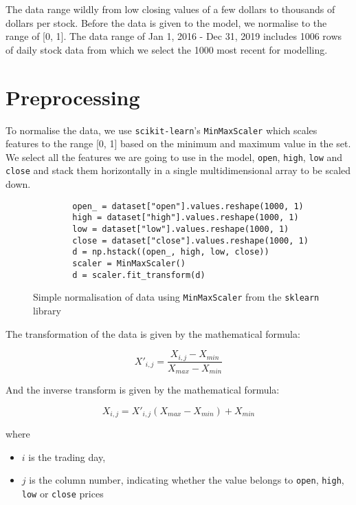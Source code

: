 The data range wildly from low closing values of a few dollars to thousands of dollars per stock. Before the data is given to the model, we normalise to the range of [0, 1]. The data range of Jan 1, 2016 - Dec 31, 2019 includes 1006 rows of daily stock data from which we select the 1000 most recent for modelling.

\section{Preprocessing}

To normalise the data, we use \texttt{scikit-learn}'s \texttt{MinMaxScaler} which scales features to the range [0, 1] based on the minimum and maximum value in the set. We select all the features we are going to use in the model, \texttt{open}, \texttt{high}, \texttt{low} and \texttt{close} and stack them horizontally in a single multidimensional array to be scaled down.

\begin{figure}[H]
    \begin{verbatim}
        open_ = dataset["open"].values.reshape(1000, 1)
        high = dataset["high"].values.reshape(1000, 1)
        low = dataset["low"].values.reshape(1000, 1)
        close = dataset["close"].values.reshape(1000, 1)
        d = np.hstack((open_, high, low, close))
        scaler = MinMaxScaler()
        d = scaler.fit_transform(d)
    \end{verbatim}
    \caption{Simple normalisation of data using \texttt{MinMaxScaler} from the \texttt{sklearn} library}
    \label{code:data_scaling}
\end{figure}

The transformation of the data is given by the mathematical formula:

\begin{equation}
    X'_{i, j} = \frac{X_{i, j} - X_{min}}{X_{max} - X_{min}}
\end{equation}

And the inverse transform is given by the mathematical formula:

\begin{equation}
    X_{i, j} = X'_{i, j} (X_{max} - X_{min}) + X_{min}
\end{equation}

where 
\begin{itemize}[nosep]
    \item[] $i$ is the trading day,
    \item[] $j$ is the column number, indicating whether the value belongs to \texttt{open}, \texttt{high}, \texttt{low} or \texttt{close} prices
\end{itemize}

